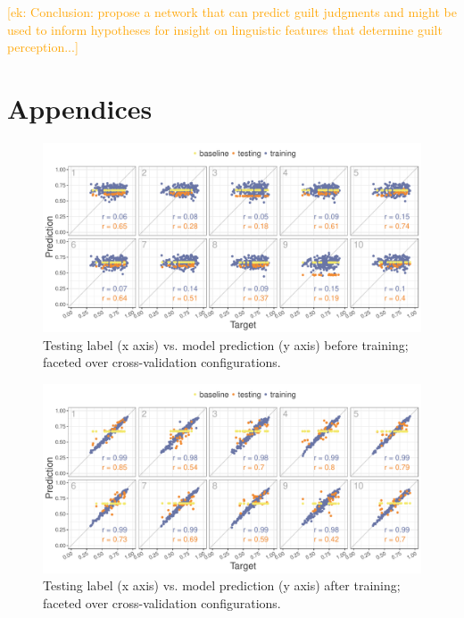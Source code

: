 \documentclass[11pt,a4paper]{article}
\newcommand{\ek}[1]{\textcolor{Orange}{[ek: #1]}}
\begin{document}
\ek{Conclusion: propose a network that can predict guilt judgments and might be used to inform hypotheses for insight on linguistic features that determine guilt perception...}









\onecolumn
\section{Appendices}
\label{sec:appendix}

\begin{figure}[!htb]
	\includegraphics[width=\linewidth]{graphs/all-pred-target-epoch1.pdf}
	\caption{Testing label (x axis) vs. model prediction (y axis) before training; faceted over cross-validation configurations.}
	\label{fig:app-corr-pretraining}
\end{figure}

\begin{figure}[!htb]
	\includegraphics[width=\linewidth]{graphs/all-pred-target-epoch30.pdf}
	\caption{Testing label (x axis) vs. model prediction (y axis) after training; faceted over cross-validation configurations.}
	\label{fig:app-corr-posttraining}
\end{figure}
\end{document}
